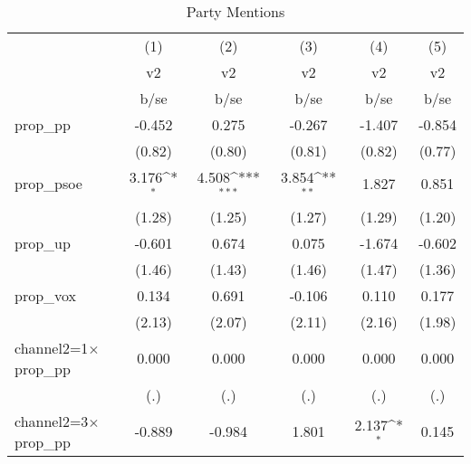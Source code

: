 \begin{table}[htbp]\centering
\def\sym#1{\ifmmode^{#1}\else\(^{#1}\)\fi}
\caption{Party Mentions \label{table\_pol }}
\begin{tabular}{l*{5}{c}}
\toprule
                    &\multicolumn{1}{c}{(1)}&\multicolumn{1}{c}{(2)}&\multicolumn{1}{c}{(3)}&\multicolumn{1}{c}{(4)}&\multicolumn{1}{c}{(5)}\\
                    &\multicolumn{1}{c}{v2}&\multicolumn{1}{c}{v2}&\multicolumn{1}{c}{v2}&\multicolumn{1}{c}{v2}&\multicolumn{1}{c}{v2}\\
                    &        b/se         &        b/se         &        b/se         &        b/se         &        b/se         \\
\midrule
prop\_pp             &      -0.452         &       0.275         &      -0.267         &      -1.407         &      -0.854         \\
                    &      (0.82)         &      (0.80)         &      (0.81)         &      (0.82)         &      (0.77)         \\
prop\_psoe           &       3.176\sym{*}  &       4.508\sym{***}&       3.854\sym{**} &       1.827         &       0.851         \\
                    &      (1.28)         &      (1.25)         &      (1.27)         &      (1.29)         &      (1.20)         \\
prop\_up             &      -0.601         &       0.674         &       0.075         &      -1.674         &      -0.602         \\
                    &      (1.46)         &      (1.43)         &      (1.46)         &      (1.47)         &      (1.36)         \\
prop\_vox            &       0.134         &       0.691         &      -0.106         &       0.110         &       0.177         \\
                    &      (2.13)         &      (2.07)         &      (2.11)         &      (2.16)         &      (1.98)         \\
channel2=1$\times$prop\_pp&       0.000         &       0.000         &       0.000         &       0.000         &       0.000         \\
                    &         (.)         &         (.)         &         (.)         &         (.)         &         (.)         \\
channel2=3$\times$prop\_pp&      -0.889         &      -0.984         &       1.801         &       2.137\sym{*}  &       0.145         \\

\end{tabular}
\end{table}
